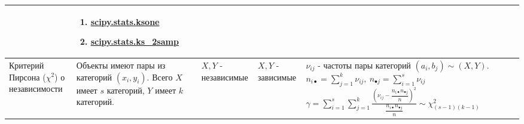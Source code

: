 \documentclass[14pt, a1paper, fleqn]{extarticle}
\begin{document}
\begin{center}
\begin{tabular}{|p{6cm}|p{8cm}|p{3cm}|p{3cm}|p{9cm}|p{10cm}|p{14cm}|}
\begin{enumerate}
            \end{enumerate} 
            & \begin{enumerate}
                \item \href{https://docs.scipy.org/doc/scipy/reference/generated/scipy.stats.ksone.html}{scipy.stats.ksone}
                \item \href{https://docs.scipy.org/doc/scipy/reference/generated/scipy.stats.ks_2samp.html}{scipy.stats.ks\_2samp}
            \end{enumerate} \\
            \hline
            Критерий Пирсона (\( \chi^2 \)) о независимости
            & Объекты имеют пары из категорий \( (x_i, y_i) \). Всего \( X \) имеет \( s \) категорий, \( Y \) имеет \( k \) категорий.
            & \( X, Y \) - независимые
            & \( X, Y \) - зависимые 
            & \( \nu_{ij} \) - частоты пары категорий \( (a_{i}, b_{j}) \sim (X,  Y) \).
            \newline
            \( n_{i \bullet} = \sum_{j=1}^{k} \nu_{ij}, ~ n_{\bullet j} = \sum_{i=1}^{s} \nu_{ij} \)
            \newline
            \( \gamma = \sum_{i=1}^{s} \sum_{j=1}^{k} \frac{\left( \nu_{ij} - \dfrac{n_{i \bullet} n_{\bullet j}}{n} \right)^2}{\dfrac{n_{i \bullet} n_{\bullet j}}{n}} \sim \chi^2_{(s-1)(k-1)} \)


\end{tabular}
\end{center}
\end{document}

